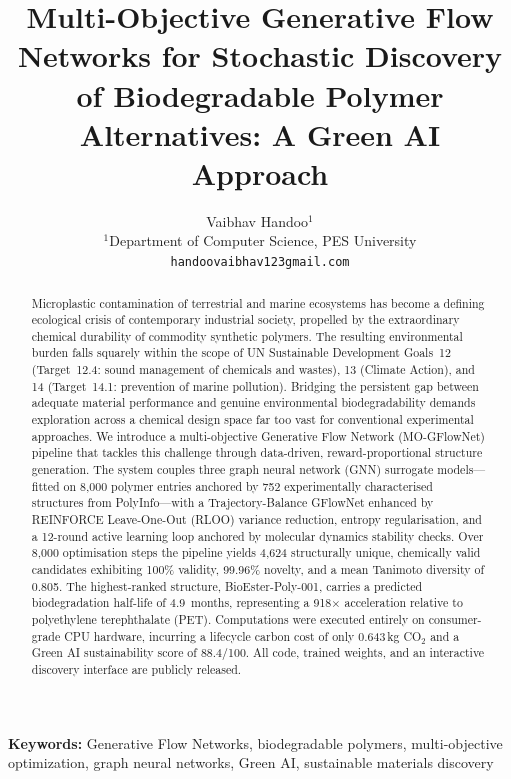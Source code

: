 \documentclass[twocolumn,10pt]{article}
\title{\textbf{Multi-Objective Generative Flow Networks for Stochastic Discovery of Biodegradable Polymer Alternatives: A Green AI Approach}}
\author{
  Vaibhav Handoo$^{1}$ \\
  \small $^{1}$Department of Computer Science, PES University \\
  \small \texttt{handoovaibhav123gmail.com}
}
\date{}
\begin{document}
\flushbottom
\maketitle

\begin{abstract}
\vspace{-1.5em}
Microplastic contamination of terrestrial and marine ecosystems has become a defining ecological
crisis of contemporary industrial society, propelled by the extraordinary chemical durability of
commodity synthetic polymers. The resulting environmental burden falls squarely within the scope
of UN Sustainable Development Goals~12 (Target~12.4: sound management of chemicals and
wastes), 13 (Climate Action), and 14 (Target~14.1: prevention of marine pollution). Bridging
the persistent gap between adequate material performance and genuine environmental
biodegradability demands exploration across a chemical design space far too vast for
conventional experimental approaches. We introduce a multi-objective Generative Flow Network
(MO-GFlowNet) pipeline that tackles this challenge through data-driven, reward-proportional
structure generation. The system couples three graph neural network (GNN) surrogate models---
fitted on 8,000 polymer entries anchored by 752 experimentally characterised structures from
PolyInfo---with a Trajectory-Balance GFlowNet enhanced by REINFORCE Leave-One-Out (RLOO)
variance reduction, entropy regularisation, and a 12-round active learning loop anchored by
molecular dynamics stability checks. Over 8,000 optimisation steps the pipeline yields 4,624
structurally unique, chemically valid candidates exhibiting 100\% validity, 99.96\% novelty, and
a mean Tanimoto diversity of 0.805. The highest-ranked structure, BioEster-Poly-001, carries a
predicted biodegradation half-life of 4.9~months, representing a 918$\times$ acceleration
relative to polyethylene terephthalate (PET). Computations were executed entirely on
consumer-grade CPU hardware, incurring a lifecycle carbon cost of only 0.643\,kg CO$_2$ and
a Green AI sustainability score of 88.4/100. All code, trained weights, and an interactive
discovery interface are publicly released.
\end{abstract}

\noindent\textbf{Keywords:} Generative Flow Networks, biodegradable polymers, multi-objective optimization, graph neural networks, Green AI, sustainable materials discovery

\end{document}
